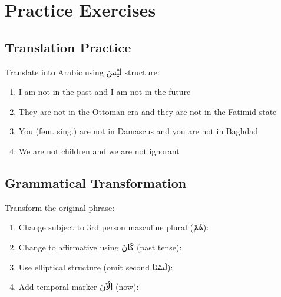 \documentclass[letterpaper,12pt]{article}
\begin{document}
\section{Practice Exercises}

\subsection{Translation Practice}

Translate into Arabic using \textarabic{لَيْسَ} structure:

\begin{enumerate}
\item I am not in the past and I am not in the future
\vspace{2em}

\item They are not in the Ottoman era and they are not in the Fatimid state
\vspace{2em}

\item You (fem. sing.) are not in Damascus and you are not in Baghdad
\vspace{2em}

\item We are not children and we are not ignorant
\vspace{2em}
\end{enumerate}

\subsection{Grammatical Transformation}

Transform the original phrase:

\begin{enumerate}
\item Change subject to 3rd person masculine plural (\textarabic{هُمْ}):
\vspace{2em}

\item Change to affirmative using \textarabic{كَانَ} (past tense):
\vspace{2em}

\item Use elliptical structure (omit second \textarabic{لَسْنَا}):
\vspace{2em}

\item Add temporal marker \textarabic{الْآنَ} (now):
\vspace{2em}
\end{enumerate}
\end{document}
